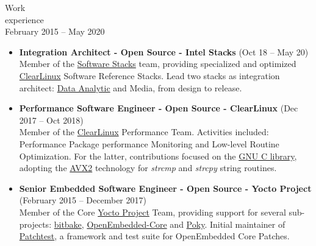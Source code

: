 \documentclass{resume}
\def\intel{Intel Corporation}
\def\cl{ClearLinux}
\begin{document}
\begin{category}{Work \\experience}
  \citem{\intel}\\
  February 2015 -- May 2020

  \begin{itemize}
  \item \textbf{Integration Architect - Open Source - Intel Stacks} (Oct 18 -- May 20)\\
    Member of the \href{https://github.com/intel/stacks}{Software Stacks} team,
    providing specialized and optimized \href{https://clearlinux.org/}{\cl} Software Reference Stacks.
    Lead two stacks as integration architect:
    \href{https://github.com/intel/stacks/blob/master/dars/dars.rst}{Data Analytic}
    and Media, from design to release.
  \end{itemize}

  \begin{itemize}
  \item \textbf{Performance Software Engineer - Open Source - ClearLinux} (Dec 2017 -- Oct 2018)\\
    Member of the \href{https://clearlinux.org/}{ClearLinux} Performance Team.
    Activities included: Performance Package performance Monitoring and Low-level Routine Optimization.
    For the latter, contributions focused on the \href{https://www.gnu.org/software/libc/}{GNU C library},
    adopting the \href{https://patchwork.ozlabs.org/project/glibc/list/?submitter=74072}{AVX2} technology
    for \textit{strcmp} and \textit{strcpy} string routines.
  \end{itemize}

  \begin{itemize}
  \item \textbf{Senior Embedded Software Engineer - Open Source - Yocto Project} (February 2015 -- December 2017)\\
    Member of the Core \href{https://www.yoctoproject.org/}{Yocto Project} Team,
    providing support for several sub-projects:
    \href{https://lists.openembedded.org/g/bitbake-devel/search?p=recentpostdate%252Fsticky%2C%2C%2C20%2C2%2C0%2C0&q=Leonardo+Sandoval}{bitbake},
    \href{https://lists.openembedded.org/g/openembedded-core/search?p=recentpostdate%252Fsticky%2C%2C%2C20%2C2%2C0%2C0&q=Leonardo+Sandoval}{OpenEmbedded-Core} and
    \href{https://lists.yoctoproject.org/g/poky/search?p=created%2C0%2C%2C1%2C2%2C0%2C0&q=Leonardo+Sandoval}{Poky}. Initial maintainer of
    \href{http://git.yoctoproject.org/cgit/cgit.cgi/patchtest/}{Patchtest},
    a framework and test suite for OpenEmbedded Core Patches.
  \end{itemize}


\end{category}
\end{document}
